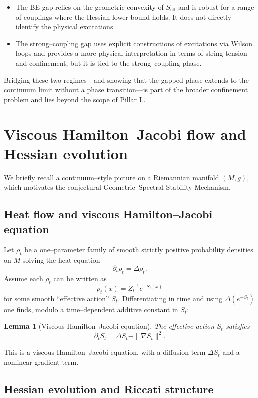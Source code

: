 \documentclass[11pt]{article}
\numberwithin{equation}{section}
\newtheorem{lemma}[theorem]{Lemma}
\begin{document}
\begin{itemize}
  \item The BE gap relies on the geometric convexity of $S_{\mathrm{eff}}$
  and is robust for a range of couplings where the Hessian lower bound
  holds.  It does not directly identify the physical excitations.

  \item The strong--coupling gap uses explicit constructions of
  excitations via Wilson loops and provides a more physical
  interpretation in terms of string tension and confinement, but it is
  tied to the strong--coupling phase.
\end{itemize}

Bridging these two regimes---and showing that the gapped phase extends
to the continuum limit without a phase transition---is part of the
broader confinement problem and lies beyond the scope of Pillar L.

\section{Viscous Hamilton--Jacobi flow and Hessian evolution}

We briefly recall a continuum--style picture on a Riemannian manifold
$(M,g)$, which motivates the conjectural Geometric--Spectral Stability
Mechanism.

\subsection{Heat flow and viscous Hamilton--Jacobi equation}

Let $\rho_t$ be a one--parameter family of smooth strictly positive
probability densities on $M$ solving the heat equation
\[
  \partial_t \rho_t = \Delta \rho_t.
\]
Assume each $\rho_t$ can be written as
\[
  \rho_t(x) = Z_t^{-1} e^{-S_t(x)}
\]
for some smooth ``effective action'' $S_t$.  Differentiating in time and
using $\Delta(e^{-S_t})$ one finds, modulo a time--dependent additive
constant in $S_t$:

\begin{lemma}[Viscous Hamilton--Jacobi equation]
\label{lem:vHJ}
The effective action $S_t$ satisfies
\[
  \partial_t S_t = \Delta S_t - \|\nabla S_t\|^2.
\]
\end{lemma}

This is a viscous Hamilton--Jacobi equation, with a diffusion term
$\Delta S_t$ and a nonlinear gradient term.

\subsection{Hessian evolution and Riccati structure}
\end{document}
